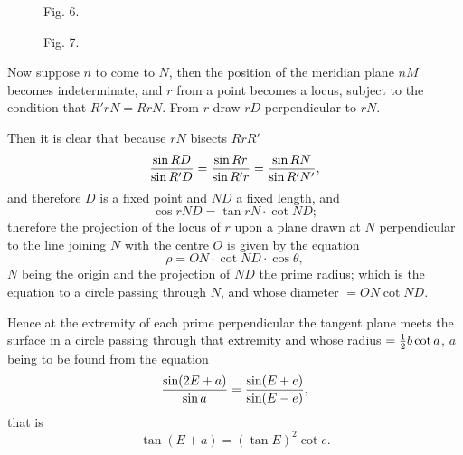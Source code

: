 \documentclass[11pt]{article}
\newcommand{\figcaption}[1]{\par\smallskip\centerline{\small #1}\smallskip}
\begin{document}
\begin{figure}[h]
\centering
{}
\figcaption{Fig. 6.}
\medskip
{}
\figcaption{Fig. 7.}
\end{figure}

Now suppose $n$ to come to $N$, then the position of the meridian plane $nM$ becomes indeterminate, and $r$ from a point becomes a locus, subject to the condition that $R'rN=RrN$. From $r$ draw $rD$ perpendicular to $rN$.

Then it is clear that because $rN$ bisects $RrR'$
\[
 {\sin RD\over\sin R'D}={\sin Rr\over\sin R'r}={\sin RN\over\sin R'N'},
\]
and therefore $D$ is a fixed point and $ND$ a fixed length, and
\[
 \cos rND=\tan rN\cdot \cot ND;
\]
therefore the projection of the locus of $r$ upon a plane drawn at $N$ perpendicular to the line joining $N$ with the centre $O$ is given by the equation
\[
 \rho=ON\cdot\cot ND\cdot\cos\theta,
\]
$N$ being the origin and the projection of $ND$ the prime radius; which is the equation to a circle passing through $N$, and whose diameter $=ON\cot ND$.

Hence at the extremity of each prime perpendicular the tangent plane meets the surface in a circle passing through that extremity and whose radius $={1\over2}b\cot a$, $a$ being to be found from the equation
\[
 {\sin(2E+a)\over\sin a}={\sin(E+e)\over\sin(E-e)},
\]
that is
\[
 \tan(E+a)=(\tan E)^2\cot e.
\]
\end{document}
